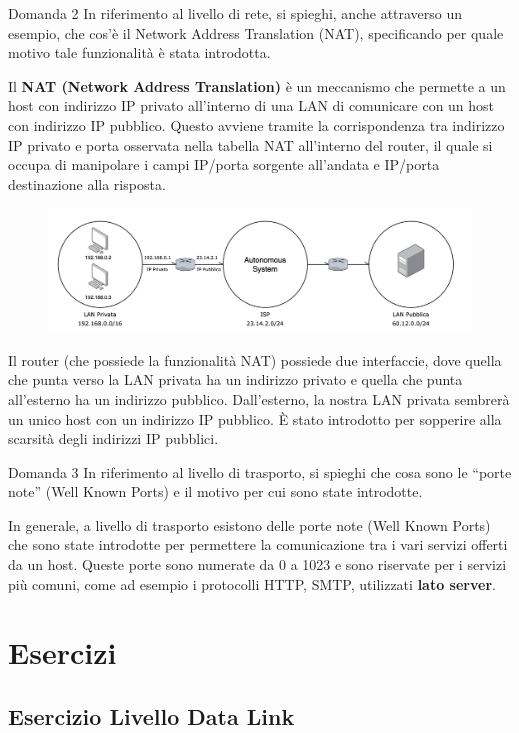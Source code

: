 \documentclass[a4paper]{article}
\begin{document}
\begin{examplebox}{Domanda 2} 
    In riferimento al livello di rete, si spieghi, anche attraverso un esempio, che cos’è il Network Address
Translation (NAT), specificando per quale motivo tale funzionalità è stata introdotta.
\end{examplebox}
\noindent
Il \textbf{NAT (Network Address Translation)} è un meccanismo che permette a un host con indirizzo IP privato all’interno di una LAN di comunicare con un host con indirizzo IP pubblico. 
Questo avviene tramite la corrispondenza tra indirizzo IP privato e porta osservata nella tabella NAT all’interno del router, il quale si occupa di manipolare i campi IP/porta sorgente all’andata e 
IP/porta destinazione alla risposta. 
\begin{figure}[H]
    \centering
    \includegraphics[width=1\textwidth]{NAT.png}
\end{figure}
\noindent
Il router (che possiede la funzionalità NAT) possiede due interfaccie, dove quella che punta verso la LAN privata ha un indirizzo privato e quella che punta all'esterno ha un indirizzo pubblico.
Dall'esterno, la nostra LAN privata sembrerà un unico host con un indirizzo IP pubblico.
È stato introdotto per sopperire alla scarsità degli indirizzi IP pubblici.
\begin{examplebox}{Domanda 3}
    In riferimento al livello di trasporto, si spieghi che cosa sono le “porte note” (Well Known Ports) e il
    motivo per cui sono state introdotte.
\end{examplebox}
\noindent
In generale, a livello di trasporto esistono delle porte note (Well Known Ports) che sono state introdotte per permettere la comunicazione tra i vari servizi offerti da un host.
Queste porte sono numerate da 0 a 1023 e sono riservate per i servizi più comuni, come ad esempio i protocolli HTTP, SMTP, utilizzati \textbf{lato server}.

\section{Esercizi}

\subsection{Esercizio Livello Data Link}
\end{document}
